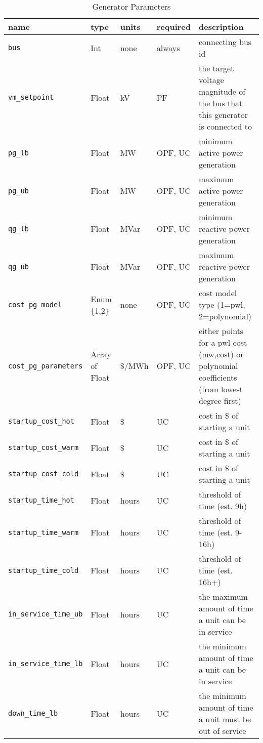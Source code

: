 \documentclass{article}
\begin{document}
\begin{table}[h!]
\centering
\caption{Generator Parameters}
\begin{tabular}{|l|l|l|l|p{6cm}|}
\hline
name & type & units & required & description \\ 
\hline
\hline
\texttt{bus} & Int & none & always & connecting bus id \\ 
\hline
\texttt{vm\_setpoint} & Float & kV & PF & the target voltage magnitude of the bus that this generator is connected to \\ 
\hline
\texttt{pg\_lb} & Float & MW & OPF, UC & minimum active power generation \\ 
\hline
\texttt{pg\_ub} & Float & MW & OPF, UC & maximum active power generation \\ 
\hline
\texttt{qg\_lb} & Float & MVar & OPF, UC & minimum reactive power generation \\ 
\hline
\texttt{qg\_ub} & Float & MVar & OPF, UC & maximum reactive power generation \\ 
\hline
\texttt{cost\_pg\_model} & Enum \{1,2\} & none & OPF, UC & cost model type (1=pwl, 2=polynomial) \\
\hline
\texttt{cost\_pg\_parameters} & Array of Float & \$/MWh & OPF, UC & either points for a pwl cost (mw,cost) or polynomial coefficients (from lowest degree first) \\
\hline
\texttt{startup\_cost\_hot} & Float & \$ & UC  & cost in \$ of starting a unit \\
\hline
\texttt{startup\_cost\_warm} & Float & \$ & UC  & cost in \$ of starting a unit \\
\hline
\texttt{startup\_cost\_cold} & Float & \$ & UC  & cost in \$ of starting a unit \\
\hline
\texttt{startup\_time\_hot} & Float & hours & UC  & threshold of time (est. 9h) \\
\hline
\texttt{startup\_time\_warm} & Float & hours & UC  & threshold of time (est. 9-16h) \\
\hline
\texttt{startup\_time\_cold} & Float & hours & UC  & threshold of time (est. 16h+) \\
\hline
%
\texttt{in\_service\_time\_ub} & Float & hours & UC & the maximum amount of time a unit can be in service \\
\hline
\texttt{in\_service\_time\_lb} & Float & hours & UC & the minimum amount of time a unit can be in service \\
\hline
\texttt{down\_time\_lb} & Float & hours & UC & the minimum amount of time a unit must be out of service \\

\end{tabular}
\end{table}
\end{document}
